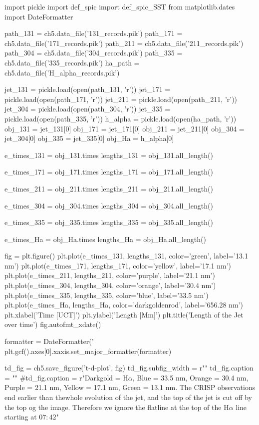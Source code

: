 \begin{pycode}[chapter5]
import pickle
import def_spic
import def_spic_SST
from matplotlib.dates import DateFormatter

path_131 = ch5.data_file('131_records.pik')
path_171 = ch5.data_file('171_records.pik')
path_211 = ch5.data_file('211_records.pik')
path_304 = ch5.data_file('304_records.pik')
path_335 = ch5.data_file('335_records.pik')
ha_path = ch5.data_file('H_alpha_records.pik')

jet_131 = pickle.load(open(path_131, 'r'))
jet_171 = pickle.load(open(path_171, 'r'))
jet_211 = pickle.load(open(path_211, 'r'))
jet_304 = pickle.load(open(path_304, 'r'))
jet_335 = pickle.load(open(path_335, 'r'))
h_alpha = pickle.load(open(ha_path, 'r'))
obj_131 = jet_131[0]
obj_171 = jet_171[0]
obj_211 = jet_211[0]
obj_304 = jet_304[0]
obj_335 = jet_335[0]
obj_Ha = h_alpha[0]

e_times_131 = obj_131.times
lengths_131 = obj_131.all_length()

e_times_171 = obj_171.times
lengths_171 = obj_171.all_length()

e_times_211 = obj_211.times
lengths_211 = obj_211.all_length()

e_times_304 = obj_304.times
lengths_304 = obj_304.all_length()

e_times_335 = obj_335.times
lengths_335 = obj_335.all_length()

e_times_Ha = obj_Ha.times
lengths_Ha = obj_Ha.all_length()

fig = plt.figure()
plt.plot(e_times_131, lengths_131, color='green', label='13.1 nm')
plt.plot(e_times_171, lengths_171, color='yellow', label='17.1 nm')
plt.plot(e_times_211, lengths_211, color='purple', label='21.1 nm')
plt.plot(e_times_304, lengths_304, color='orange', label='30.4 nm')
plt.plot(e_times_335, lengths_335, color='blue', label='33.5 nm')
plt.plot(e_times_Ha, lengths_Ha, color='darkgoldenrod', label='656.28 nm')
plt.xlabel('Time [UCT]')
plt.ylabel('Length [Mm]')
plt.title('Length of the Jet over time')
fig.autofmt_xdate()

formatter = DateFormatter('%
plt.gcf().axes[0].xaxis.set_major_formatter(formatter)

td_fig = ch5.save_figure('t-d-plot', fig)
td_fig.subfig_width = r"\columnwidth"
td_fig.caption = ""
#td_fig.caption = r"Darkgold = H$\alpha$, Blue = 33.5 nm, Orange = 30.4 nm, Purple = 21.1 nm, Yellow = 17.1 nm, Green = 13.1 nm. The CRISP observations end earlier than thewhole evolution of the jet, and the top of the jet is cut off by the top og the image. Therefore we ignore the flatline at the top of the H$\alpha$ line starting at $07:42$"
\end{pycode}

